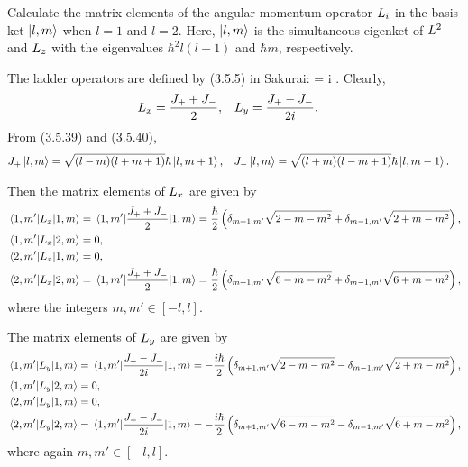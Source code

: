 \begin{problem}
	Calculate the matrix elements of the angular momentum operator $L_i$ in the basis ket $\ket{l, m}$ when $l = 1$ and $l = 2$.  Here, $\ket{l, m}$ is the simultaneous eigenket of $L^2$ and $L_z$ with the eigenvalues $\hbar^2 l (l + 1)$ and $\hbar m$, respectively.
\end{problem}

\begin{solution}
	The ladder operators are defined by (3.5.5) in Sakurai:
	\beq
		\Jpm = \Lx \pm i \Ly.
	\eeq
	Clearly,
	\begin{align*}
		L_x &= \frac{J_+ + J_-}{2}, &
		L_y &= \frac{J_+ - J_-}{2 i}.
	\end{align*}
	From (3.5.39) and (3.5.40),
	\begin{align*}
		J_+ \ket{l, m} &= \sqrt{(l - m)(l + m + 1)} \hbar \ket{l, m+1}, &
		J_- \ket{l, m} &= \sqrt{(l + m)(l - m + 1)} \hbar \ket{l, m-1}.
	\end{align*}
	
	Then the matrix elements of $L_x$ are given by
	\begin{align*}
		\mel*{1, m'}{L_x}{1, m} &= \mel*{1, m'}{\frac{J_+ + J_-}{2}}{1, m} = \frac{\hbar}{2} \left( \delta_{m+1, m'} \sqrt{2 - m - m^2} + \delta_{m-1, m'} \sqrt{2 + m - m^2} \right), \\
		\mel*{1, m'}{L_x}{2, m} &= 0, \\
		\mel*{2, m'}{L_x}{1, m} &= 0, \\
		\mel*{2, m'}{L_x}{2, m} &= \mel*{1, m'}{\frac{J_+ + J_-}{2}}{1, m} = \frac{\hbar}{2} \left( \delta_{m+1, m'} \sqrt{6 - m - m^2} + \delta_{m-1, m'} \sqrt{6 + m - m^2} \right),
	\end{align*}
	where the integers $m, m' \in [-l, l]$.
	
	The matrix elements of $L_y$ are given by
	\begin{align*}
		\mel*{1, m'}{L_y}{1, m} &= \mel*{1, m'}{\frac{J_+ - J_-}{2 i}}{1, m} = -\frac{i\hbar}{2} \left( \delta_{m+1, m'} \sqrt{2 - m - m^2} - \delta_{m-1, m'} \sqrt{2 + m - m^2} \right), \\
		\mel*{1, m'}{L_y}{2, m} &= 0, \\
		\mel*{2, m'}{L_y}{1, m} &= 0, \\
		\mel*{2, m'}{L_y}{2, m} &= \mel*{1, m'}{\frac{J_+ - J_-}{2 i}}{1, m} = -\frac{i\hbar}{2} \left( \delta_{m+1, m'} \sqrt{6 -m - m^2} - \delta_{m-1, m'} \sqrt{6 + m - m^2} \right),
	\end{align*}
	where again $m, m' \in [-l, l]$.
		

\end{solution}
